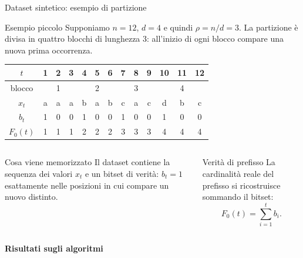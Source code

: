 \documentclass[aspectratio=169,11pt]{beamer}
\newcommand{\Fzero}{F_0}
\begin{document}
\begin{frame}{Dataset sintetico: esempio di partizione}
  \begin{block}{Esempio piccolo}
    \small
    Supponiamo \(n=12\), \(d=4\) e quindi \(\rho=n/d=3\).
    La partizione \`e divisa in quattro blocchi di lunghezza \(3\):
    all'inizio di ogni blocco compare una nuova prima occorrenza.
  \end{block}

  \vspace{0.05cm}

  \centering
  \scriptsize
  \begin{tabular}{@{}c|cccccccccccc@{}}
    \toprule
    \(t\) & 1 & 2 & 3 & 4 & 5 & 6 & 7 & 8 & 9 & 10 & 11 & 12 \\
    \midrule
    blocco & \multicolumn{3}{c}{1} & \multicolumn{3}{c}{2}
           & \multicolumn{3}{c}{3} & \multicolumn{3}{c}{4} \\
    \(x_t\) & a & a & a & b & a & b & c & a & c & d & b & c \\
    \(b_t\) & 1 & 0 & 0 & 1 & 0 & 0 & 1 & 0 & 0 & 1 & 0 & 0 \\
    \(\Fzero(t)\) & 1 & 1 & 1 & 2 & 2 & 2 & 3 & 3 & 3 & 4 & 4 & 4 \\
    \bottomrule
  \end{tabular}

  \vspace{0.18cm}

  \begin{columns}[T,onlytextwidth]
      \begin{block}{Cosa viene memorizzato}
        \footnotesize
        Il dataset contiene la sequenza dei valori \(x_t\) e un bitset di verit\`a:
        \(b_t=1\) esattamente nelle posizioni in cui compare un nuovo distinto.
      \end{block}
      \begin{alertblock}{Verit\`a di prefisso}
        \footnotesize
        La cardinalit\`a reale del prefisso si ricostruisce sommando il bitset:
        \[
          \Fzero(t)=\sum_{i=1}^{t} b_i.
        \]
      \end{alertblock}
  \end{columns}
\end{frame}

\begin{frame}[plain]
  \centering
  \vfill
  {\LARGE\bfseries Risultati sugli algoritmi}
  \vfill
\end{frame}
\end{document}
